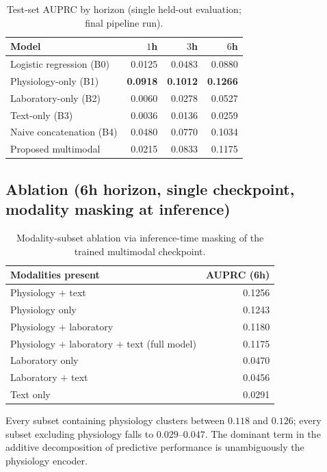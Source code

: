 \documentclass[11pt]{article}
\newcommand{\1}[1]{\mathbf{1}\!\left[#1\right]}
\begin{document}
\begin{table}[h]
\centering
\caption{Test-set AUPRC by horizon (single held-out evaluation; final pipeline run).}
\label{tab:auprc}
\begin{tabular}{lrrr}
\toprule
Model & $1$h & $3$h & $6$h \\
\midrule
Logistic regression (B0) & 0.0125 & 0.0483 & 0.0880 \\
Physiology-only (B1) & \textbf{0.0918} & \textbf{0.1012} & \textbf{0.1266} \\
Laboratory-only (B2) & 0.0060 & 0.0278 & 0.0527 \\
Text-only (B3) & 0.0036 & 0.0136 & 0.0259 \\
Naive concatenation (B4) & 0.0480 & 0.0770 & 0.1034 \\
Proposed multimodal & 0.0215 & 0.0833 & 0.1175 \\
\bottomrule
\end{tabular}
\end{table}

\subsection{Ablation (6h horizon, single checkpoint, modality masking at inference)}\label{sec:ablation}

\begin{table}[h]
\centering
\caption{Modality-subset ablation via inference-time masking of the trained multimodal checkpoint.}
\begin{tabular}{lr}
\toprule
Modalities present & AUPRC (6h) \\
\midrule
Physiology $+$ text & 0.1256 \\
Physiology only & 0.1243 \\
Physiology $+$ laboratory & 0.1180 \\
Physiology $+$ laboratory $+$ text (full model) & 0.1175 \\
Laboratory only & 0.0470 \\
Laboratory $+$ text & 0.0456 \\
Text only & 0.0291 \\
\bottomrule
\end{tabular}
\end{table}
Every subset containing physiology clusters between $0.118$ and $0.126$; every subset excluding physiology falls to $0.029$--$0.047$. The dominant term in the additive decomposition of predictive performance is unambiguously the physiology encoder.
\end{document}
